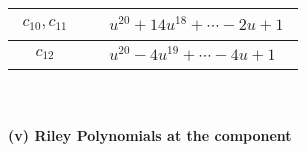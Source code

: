 \documentclass[1p]{elsarticle_modified}
\theoremstyle{definition}
\begin{document}
\begin{tabular}{m{50pt}|m{274pt}}
\hline $$\begin{aligned}c_{10},c_{11}\end{aligned}$$&$\begin{aligned}
&u^{20}+14 u^{18}+\cdots-2 u+1
\end{aligned}$\\
\hline $$\begin{aligned}c_{12}\end{aligned}$$&$\begin{aligned}
&u^{20}-4 u^{19}+\cdots-4 u+1
\end{aligned}$\\
\hline
\end{tabular}\\~\\
\newpage\renewcommand{\arraystretch}{1}
\flushleft \textbf{(v) Riley Polynomials at the component}\newline \\
\end{document}

